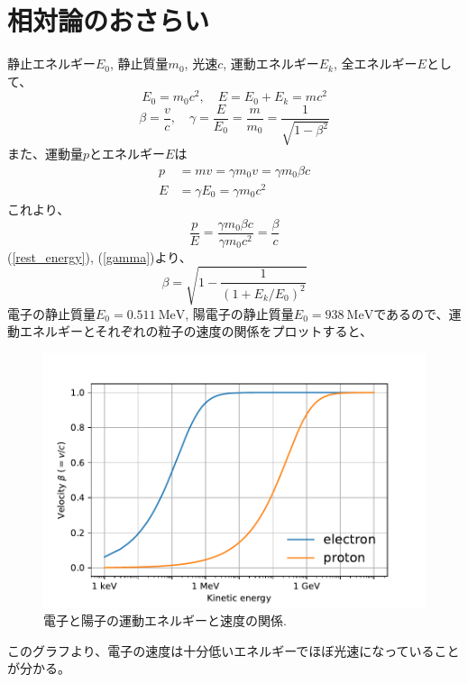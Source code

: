 \documentclass[10pt,a4paper]{ltjsarticle}
\begin{document}
\section{相対論のおさらい}
静止エネルギー$E_0$, 静止質量$m_0$, 光速$c$, 運動エネルギー$E_k$, 全エネルギー$E$として、
%
\begin{equation}
  E_0 = m_0 c^2 ,\quad E = E_0 + E_k = mc^2
  \label{rest_energy}
\end{equation}
%
\begin{equation}
  \beta =\frac{v}{c}, \quad \gamma = \frac{E}{E_0}=\frac{m}{m_0}=\frac{1}{\sqrt{1-\beta^2}}
  \label{gamma}
\end{equation}
%
また、運動量$p$とエネルギー$E$は
\begin{align}
  p &= mv = \gamma m_0 v = \gamma m_0 \beta c \label{momentum} \\
  E &= \gamma E_0 = \gamma m_0 c^2 \label{energy}
\end{align}
%
これより、
%
\begin{equation}
  \frac{p}{E} = \frac{\gamma m_0 \beta c}{\gamma m_0 c^2} = \frac{\beta}{c}
\end{equation}
%
(\ref{rest_energy}), (\ref{gamma})より、
%
\begin{equation}
  \beta = \sqrt{1-\frac{1}{\left(1+ E_k/E_0\right)^2}}
\end{equation}
%
電子の静止質量$E_0 = \SI{0.511}{\mega\electronvolt}$, 陽電子の静止質量$E_0 = \SI{938}{\mega\electronvolt}$であるので、運動エネルギーとそれぞれの粒子の速度の関係をプロットすると、
%
\begin{figure}[hhbt]
  \begin{center}
    \includegraphics[width=12cm,clip]{velocity.pdf}
    \caption{電子と陽子の運動エネルギーと速度の関係.}
    \label{velocity}
  \end{center}
\end{figure}
%
このグラフより、電子の速度は十分低いエネルギーでほぼ光速になっていることが分かる。
%
\end{document}
